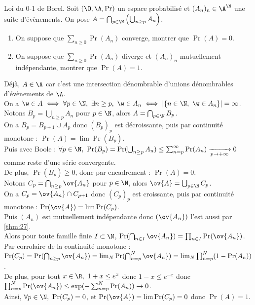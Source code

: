 \documentclass[11pt]{article}
\begin{document}
\begin{exercice}{Loi du 0-1 de Borel.}{}
    Soit $(\O,\A,\Pr)$ un espace probabilisé et $(A_n)_n\in\A^\N$ une suite d'évènements. On pose $A=\bigcap_{p\in\N}\left( \bigcup_{n\geq p} A_n \right)$.
    \begin{enumerate}
        \item On suppose que $\sum_{n\geq0}\Pr(A_n)$ converge, montrer que $\Pr(A)=0$.
        \item On suppose que $\sum_{n\geq0}\Pr(A_n)$ diverge et $(A_n)_n$ mutuellement indépendante, montrer que $\Pr(A)=1$.
    \end{enumerate}
    \tcblower
    Déjà, $A\in\A$ car c'est une intersection dénombrable d'unions dénombrables d'évènements de $\A$.\\
    On a $\w\in A \iff \forall p \in \N, ~ \exists n \geq p, ~ \w \in A_n \iff |\{n\in\N, ~ \w \in A_n\}|=\infty$.\\
     Notons $B_p = \bigcup_{n\geq p}A_n$ pour $p\in\N$, alors $A=\bigcap_{p\in\N}B_p$.\\
    On a $B_{p}=B_{p+1} \cup A_p$ donc $(B_p)_p$ est décroissante, puis par continuité monotone : $\Pr(A)=\lim\Pr(B_p)$.\\
    Puis avec Boole : $\forall p \in \N, ~ \Pr(B_p) = \Pr(\bigcup_{n\geq p}A_n) \leq \sum_{n=p}^{\infty}\Pr(A_n)\xrightarrow[p\to+\infty]{}0$ comme reste d'une série convergente.\\[-0.2cm]
    De plus, $\Pr(B_p)\geq0$, donc par encadrement : $\Pr(A)=0$.\\
     Notons $C_p = \bigcap_{n\geq p}\ov{A_n}$ pour $p\in\N$, alors $\ov{A}=\bigcup_{p\in\N}C_p$.\\
    On a $C_p = \ov{A_n}\cap C_{p+1}$ donc $(C_p)_p$ est croissante, puis par continuité monotone : $\Pr(\ov{A})=\lim\Pr(C_p)$.\\
    Puis $(A_n)$ est mutuellement indépendante donc $(\ov{A_n})$ l'est aussi par \ref{thm:27}.\\
    Alors pour toute famille finie $I\subset \N$, $\Pr(\bigcap_{n\in I}\ov{{A_n}})=\prod_{n\in I}\Pr(\ov{A_n})$.\\
    Par corrolaire de la continuité monotone : $\Pr(C_p)=\Pr(\bigcap_{n\geq p}\ov{A_n})=\lim_N\Pr(\bigcap_{n=p}^N\ov{A_n})=\lim_N \prod_{n=p}^N(1-\Pr(A_n))$.\\
    De plus, pour tout $x\in\R, ~ 1+x\leq e^x$ donc $1-x\leq e^{-x}$ donc $\prod_{n=p}^N\Pr(\ov{A_n})\leq \exp(-\sum_{n=p}^N\Pr(A_n))\to 0$.\\
    Ainsi, $\forall p \in \N, ~ \Pr(C_p)=0$, et $\Pr(\ov{A})=\lim \Pr(C_p) = 0$ donc $\Pr(A)=1$.
\end{exercice}
\end{document}

